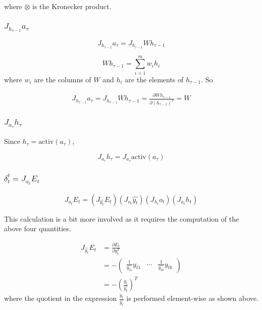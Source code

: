 where $\otimes$ is the Kronecker product.

\subsubsection{$J_{h_{\tau - 1}} a_\tau$}

\begin{equation*}
J_{h_{\tau - 1}} a_\tau = J_{h_{\tau - 1}} W h_{\tau - 1}
\end{equation*}

\begin{equation*}
W h_{\tau - 1} = \sum_{i=1}^m w_i h_i
\end{equation*}
%
where $w_i$ are the columns of $W$ and $h_i$ are the elements of $h_{\tau - 1}$. So

\begin{align*}
  J_{h_{\tau - 1}} a_\tau = J_{h_{\tau - 1}} W h_{\tau - 1} = \frac{\partial W h_{\tau - 1}}{\partial (h_{\tau-1})^T} = W
\end{align*}

\subsubsection{$J_{a_\tau} h_\tau$}

Since $h_\tau = \mbox{activ}(a_\tau)$,

\begin{equation*}
J_{a_\tau} h_\tau = J_{a_\tau}\mbox{activ}(a_\tau)
\end{equation*}

\subsubsection{$\delta_t^t = J_{a_t} E_t$}

\begin{equation*}
J_{a_t} E_t = (J_{\widehat{y_t}} E_t)(J_{o_t}\widehat{y_t})(J_{h_t}o_t)(J_{a_t}h_t)
\end{equation*}

This calculation is a bit more involved as it requires the computation of the above four quantities.

\begin{align*}
  J_{\widehat{y_t}}E_t & = \frac{\partial E_t}{\partial y_t^T} \\
  & = -\begin{pmatrix}\frac{1}{\widehat{y_{t1}}}y_{t1} & \cdots & \frac{1}{\widehat{y_{tk}}}y_{tk}\end{pmatrix} \\
  & = -\left(\frac{y_t}{\widehat{y_t}}\right)^T
\end{align*}
%
where the quotient in the expression $\frac{y_t}{\widehat{y_t}}$ is performed element-wise as shown above.

